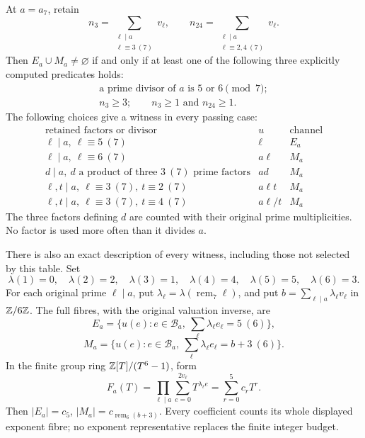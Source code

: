 \begin{theorem}
\label{thm:r7-factor-sieve}
At \(a=a_7\), retain
\[
 n_3=\sum_{\substack{\ell\mid a\\\ell\equiv3\ (7)}}v_\ell,
 \qquad
 n_{24}=\sum_{\substack{\ell\mid a\\\ell\equiv2,4\ (7)}}v_\ell.
\]
Then \(E_a\cup M_a\ne\varnothing\) if and only if at least one
of the following three explicitly computed predicates holds:
\[
 \begin{gathered}
 \text{a prime divisor of }a\text{ is }5\text{ or }6\pmod7;\\
 n_3\ge3;\qquad n_3\ge1\text{ and }n_{24}\ge1.
 \end{gathered}
\]
The following choices give a witness in every passing case:
\[
 \begin{array}{c|c|c}
 \text{retained factors or divisor}&u&\text{channel}\\ \hline
 \ell\mid a,\ \ell\equiv5\ (7)&\ell&E_a\\
 \ell\mid a,\ \ell\equiv6\ (7)&a\ell&M_a\\
 d\mid a,\ d\text{ a product of three }3\ (7)\text{ prime factors}
        &ad&M_a\\
 \ell,t\mid a,\ \ell\equiv3\ (7),\ t\equiv2\ (7)
        &a\ell t&M_a\\
 \ell,t\mid a,\ \ell\equiv3\ (7),\ t\equiv4\ (7)
        &a\ell/t&M_a
 \end{array}
\]
The three factors defining \(d\) are counted with their original
prime multiplicities. No factor is used more often than it divides \(a\).

There is also an exact description of every witness, including those
not selected by this table. Set
\[
 \lambda(1)=0,\quad\lambda(2)=2,\quad\lambda(3)=1,\quad
 \lambda(4)=4,\quad\lambda(5)=5,\quad\lambda(6)=3.
\]
For each original prime \(\ell\mid a\), put
\(\lambda_\ell=\lambda(\operatorname{rem}_7\ell)\), and put
\(b=\sum_{\ell\mid a}\lambda_\ell v_\ell\) in \(\mathbb Z/6\mathbb Z\).
The full fibres, with the original valuation inverse, are
\[
 E_a=\{u(e):e\in\mathcal B_a,\ \sum_\ell\lambda_\ell e_\ell=5\ (6)\},
\]
\[
 M_a=\{u(e):e\in\mathcal B_a,\ \sum_\ell\lambda_\ell e_\ell=b+3\ (6)\}.
\]
In the finite group ring \(\mathbb Z[T]/(T^6-1)\), form
\[
 F_a(T)=\prod_{\ell\mid a}\sum_{e=0}^{2v_\ell}T^{\lambda_\ell e}
        =\sum_{r=0}^5 c_rT^r.
\]
Then \(|E_a|=c_5\), \(|M_a|=c_{\operatorname{rem}_6(b+3)}\).
Every coefficient counts its whole displayed exponent fibre; no
exponent representative replaces the finite integer budget.
\end{theorem}
